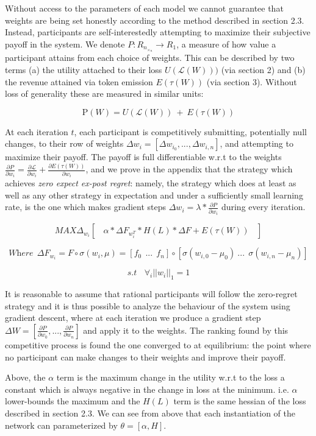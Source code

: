 \documentclass{article}
\begin{document}
Without access to the parameters of each model we cannot guarantee that weights are being set honestly according to the method described in section 2.3. Instead, participants are self-interestedly attempting to maximize their subjective payoff in the system. We denote $P: R_n_\times_n \rightarrow R_1$, a measure of how value a participant attains from each choice of weights. This can be described by two terms (a) the utility attached to their loss $U(\mathcal{L}(W)))$ (via section 2) and (b) the revenue attained via token emission $E(\tau(W))$ (via section 3). Without loss of generality these are measured in similar units:
\smallskip

\[ \textrm{P}(W) = U(\mathcal{L}(W)) \ + \ E(\tau(W)) \] 

At each iteration $t$, each participant is competitively submitting, potentially null changes, to their row of weights $\Delta w_i = [\Delta w_{i_0}, ..., \Delta w_{i, n}]$, and attempting to maximize their payoff. The payoff is full differentiable w.r.t to the weights $\frac{\partial P}{\partial w_i} = \frac{\partial \mathcal{L}}{\partial w_i} + \frac{\partial E(\tau(W))}{\partial w_i}$, and we prove in the appendix that the strategy which achieves \textit{zero expect ex-post regret}: namely, the strategy which does at least as well as any other strategy in expectation and under a sufficiently small learning rate, is the one which makes gradient steps $\Delta w_i = \lambda * \frac{\partial P}{\partial w_i}$ during every iteration.
\smallskip

\[ \textit{MAX} \Delta_w_i [ \ \ \ \ \alpha * \Delta F_w_i^T * H(L) * \Delta F  + E(\tau(W)) \ \ \ \ ] \]

\[ \textit{Where} \ \ \Delta F_w_i = F \circ \sigma(w_i, \mu) = [f_0 \ \ ... \ \ f_n] \circ [\sigma(w_{i,0} - \mu_0) \   ... \ \ \sigma(w_{i,n} - \mu_n)] \]

\[ \textit{s.t} \ \ \ \  \forall_i || w_i ||_1 = 1\]

It is reasonable to assume that rational participants will follow the zero-regret strategy and it is thus possible to analyze the behaviour of the system using gradient descent, where at each iteration we produce a gradient step $\Delta W = [\frac{\partial P}{\partial w_0}, ..., \frac{\partial P}{\partial w_n}]$ and apply it to the weights. The ranking found by this competitive process is found the one converged to at equilibrium: the point where no participant can make changes to their weights and improve their payoff.


Above, the $\alpha$ term is the maximum change in the utility w.r.t to the loss a constant which is always negative in the change in loss at the minimum. i.e. $\alpha$ lower-bounds the maximum and the $H(L)$ term is the same hessian of the loss described in section 2.3. We can see from above that each instantiation of the network can parameterized by $\theta = [\alpha, H]$.
\end{document}
